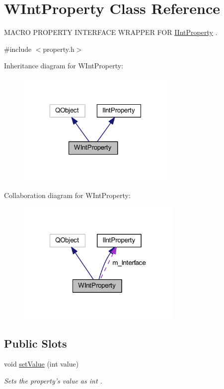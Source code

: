 \hypertarget{class_w_int_property}{\section{W\-Int\-Property Class Reference}
\label{class_w_int_property}
}


M\-A\-C\-R\-O P\-R\-O\-P\-E\-R\-T\-Y I\-N\-T\-E\-R\-F\-A\-C\-E W\-R\-A\-P\-P\-E\-R F\-O\-R \hyperlink{class_i_int_property}{I\-Int\-Property} .  




{\ttfamily \#include $<$property.\-h$>$}



Inheritance diagram for W\-Int\-Property\-:
\nopagebreak
\begin{figure}[H]
\begin{center}
\leavevmode
\includegraphics[width=217pt]{class_w_int_property__inherit__graph}
\end{center}
\end{figure}


Collaboration diagram for W\-Int\-Property\-:
\nopagebreak
\begin{figure}[H]
\begin{center}
\leavevmode
\includegraphics[width=225pt]{class_w_int_property__coll__graph}
\end{center}
\end{figure}
\subsection*{Public Slots}
\begin{DoxyCompactItemize}
\item 
void \hyperlink{class_w_int_property_a799b26a1c6622fd70068deed73547f6a}{set\-Value} (int value)
\begin{DoxyCompactList}\small\item\em Sets the property's value as int . \end{DoxyCompactList}\end{DoxyCompactItemize}
